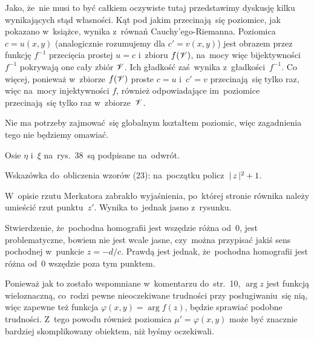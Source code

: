 \documentclass[a4paper,11pt]{article}
\begin{document}
Jako, że~nie musi to być całkiem oczywiste tutaj przedstawimy dyskusję
kilku wynikających stąd własności. Kąt pod jakim przecinają~się
poziomice, jak pokazano w~książce, wynika z~równań
Cauchy'ego-Riemanna. Poziomica $c = u( x, y )$ (analogicznie
rozumujemy dla $c' = v( x, y )$) jest obrazem przez funkcję $f^{ -1 }$
przecięcia prostej $u = c$ i~zbioru $f( \mathcal{V} )$, na~mocy więc
bijektywności~$f^{ -1 }$ pokrywają one cały zbiór $\mathcal{V}$. Ich
gładkość zaś~wynika z~gładkości~$f^{ -1 }$. Co więcej, ponieważ
w~zbiorze $f( \mathcal{V} )$ proste $c = u$ i~$c' = v$ przecinają~się
tylko raz, więc na~mocy injektywności $f$, również odpowiadające
im~poziomice przecinają~się tylko raz w~zbiorze~$\mathcal{V}$.

Nie ma potrzeby zajmować~się globalnym kształtem poziomic, więc
zagadnienia tego nie będziemy omawiać.

\vspace{\spaceFour}



\start {} Osie $\eta$ i~$\xi$ na~rys.~38~są podpisane na~odwrót.

\vspace{\spaceFour}



\start {} Wskazówka do~obliczenia wzorów (23): na~początku
policz~$|\, {  z  } \,|^{ 2 } + 1$.

\vspace{\spaceFour}



\start {} W~opisie rzutu Merkatora zabrakło wyjaśnienia,
po~której stronie równika należy umieścić rzut punktu~$z'$. Wynika
to~jednak jasno z~rysunku.

\vspace{\spaceFour}



\start {} Stwierdzenie, że~pochodna homografii jest wszędzie
różna od~0, jest problematyczne, bowiem nie jest wcale jasne,
czy~można przypisać jakiś sens pochodnej w~punkcie $z = -d / c$.
Prawdą jest jednak, że~pochodna homografii jest różna od~0 wszędzie
poza tym punktem.

\vspace{\spaceFour}



\start {} Ponieważ jak to zostało wspomniane w~komentarzu
do~str.~10, $\arg z$ jest funkcją wieloznaczną, co~rodzi pewne
nieoczekiwane trudności przy posługiwaniu~się nią, więc zapewne też
funkcja $\varphi( x, y ) = \arg f( z )$, będzie sprawiać podobne
trudności. Z~tego powodu również poziomica $\mu' = \varphi( x, y )$
może być znacznie bardziej skomplikowany obiektem, niż byśmy
oczekiwali.
\end{document}
